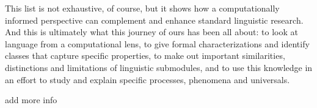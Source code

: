 This list is not exhaustive, of course, but it shows how a computationally informed perspective can complement and enhance standard linguistic research.
And this is ultimately what this journey of ours has been all about: to look at language from a computational lens, to give formal characterizations and identify classes that capture specific properties, to make out important similarities, distinctions and limitations of linguistic submodules, and to use this knowledge in an effort to study and explain specific processes, phenomena and universals.

\begin{literature}
add more info
\end{literature}

